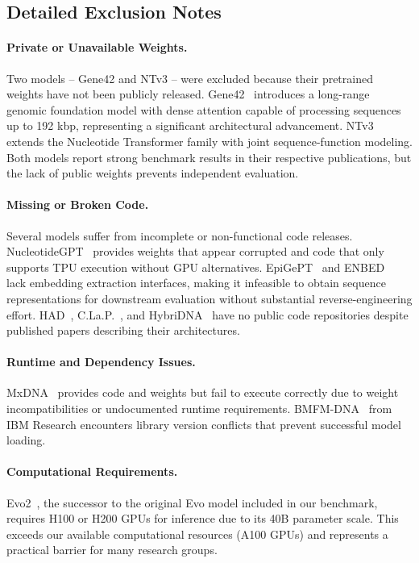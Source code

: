 \documentclass{article}
\theoremstyle{plain}
\theoremstyle{definition}
\theoremstyle{remark}
\begin{document}
\subsection{Detailed Exclusion Notes}

\paragraph{Private or Unavailable Weights.}
Two models -- Gene42 and NTv3 -- were excluded because their pretrained weights have not been publicly released. Gene42~\cite{gene42} introduces a long-range genomic foundation model with dense attention capable of processing sequences up to 192 kbp, representing a significant architectural advancement. NTv3~\cite{ntv3} extends the Nucleotide Transformer family with joint sequence-function modeling. Both models report strong benchmark results in their respective publications, but the lack of public weights prevents independent evaluation.

\paragraph{Missing or Broken Code.}
Several models suffer from incomplete or non-functional code releases. NucleotideGPT~\cite{nucleotidegpt} provides weights that appear corrupted and code that only supports TPU execution without GPU alternatives. EpiGePT~\cite{epigept} and ENBED~\cite{enbed} lack embedding extraction interfaces, making it infeasible to obtain sequence representations for downstream evaluation without substantial reverse-engineering effort. HAD~\cite{had}, C.La.P.~\cite{clap}, and HybriDNA~\cite{hybridna} have no public code repositories despite published papers describing their architectures.

\paragraph{Runtime and Dependency Issues.}
MxDNA~\cite{mxdna} provides code and weights but fail to execute correctly due to weight incompatibilities or undocumented runtime requirements. BMFM-DNA~\cite{bmfmdna} from IBM Research encounters library version conflicts that prevent successful model loading.

\paragraph{Computational Requirements.}
Evo2~\cite{evo2}, the successor to the original Evo model included in our benchmark, requires H100 or H200 GPUs for inference due to its 40B parameter scale. This exceeds our available computational resources (A100 GPUs) and represents a practical barrier for many research groups.
\end{document}
